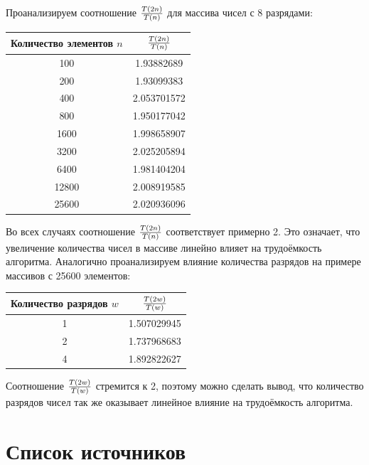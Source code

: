 \documentclass[a4paper]{article}
\begin{document}
Проанализируем соотношение ${T(2n)\over{T(n)}}$ для массива чисел с 8 разрядами:
\begin{center}
\begin{tabular}{|c|c|}
	\hline
	Количество элементов $n$ & ${T(2n)\over{T(n)}}$ \\
	\hline
	100 & 1.93882689 \\ \hline
    200 & 1.93099383 \\ \hline
    400 & 2.053701572 \\ \hline
    800 & 1.950177042 \\ \hline
    1600 & 1.998658907 \\ \hline
    3200 & 2.025205894 \\ \hline
    6400 & 1.981404204 \\ \hline
    12800 & 2.008919585 \\ \hline
    25600 & 2.020936096 \\ \hline
\end{tabular}
\end{center}
Во всех случаях соотношение ${T(2n)\over{T(n)}}$ соответствует примерно 2. Это означает, что увеличение количества чисел в массиве линейно влияет на трудоёмкость алгоритма. Аналогично проанализируем влияние количества разрядов на примере массивов с 25600 элементов:
\begin{center}
\begin{tabular}{|c|c|}
	\hline
	Количество разрядов $w$ & ${T(2w)\over{T(w)}}$ \\
	\hline
	1 & 1.507029945 \\ \hline
    2 & 1.737968683 \\ \hline
    4 & 1.892822627 \\ \hline
\end{tabular}
\end{center}
Соотношение ${T(2w)\over{T(w)}}$ стремится к 2, поэтому можно сделать вывод, что количество разрядов чисел так же оказывает линейное влияние на трудоёмкость алгоритма.

\section{Список источников}
\end{document}
